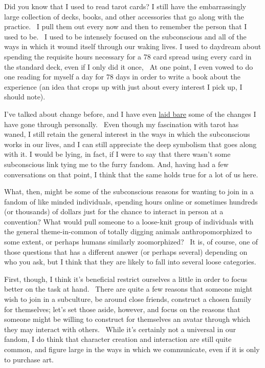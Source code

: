 Did you know that I used to read tarot cards? I still have the
embarrassingly large collection of decks, books, and other accessories
that go along with the practice. ~I pull them out every now and then to
remember the person that I used to be. ~I used to be intensely focused
on the subconscious and all of the ways in which it wound itself through
our waking lives. I used to daydream about spending the requisite hours
necessary for a 78 card spread using every card in the standard deck,
even if I only did it once, ~At one point, I even vowed to do one
reading for myself a day for 78 days in order to write a book about the
experience (an idea that crops up with just about every interest I pick
up, I should note).

I've talked about change before, and I have even
\href{http://adjectivespecies.com/2012/03/21/makyos-kaddish/}{laid bare}
some of the changes I have gone through personally. ~Even though my
fascination with tarot has waned, I still retain the general interest in
the ways in which the subconscious works in our lives, and I can still
appreciate the deep symbolism that goes along with it. I would be lying,
in fact, if I were to say that there wasn't some subconscious link tying
me to the furry fandom. And, having had a few conversations on that
point, I think that the same holds true for a lot of us here.

What, then, might be some of the subconscious reasons for wanting to
join in a fandom of like minded individuals, spending hours online or
sometimes hundreds (or thousands) of dollars just for the chance to
interact in person at a convention? What would pull someone to a
loose-knit group of individuals with the general theme-in-common of
totally digging animals anthropomorphized to some extent, or perhaps
humans similarly zoomorphized? ~It is, of course, one of those questions
that has a different answer (or perhaps several) depending on who you
ask, but I think that they are likely to fall into several loose
categories.

First, though, I think it's beneficial restrict ourselves a little in
order to focus better on the task at hand. ~There are quite a few
reasons that someone might wish to join in a subculture, be around close
friends, construct a chosen family for themselves; let's set those
aside, however, and focus on the reasons that someone might be willing
to construct for themselves an avatar through which they may interact
with others. ~While it's certainly not a universal in our fandom, I do
think that character creation and interaction are still quite common,
and figure large in the ways in which we communicate, even if it is only
to purchase art.


